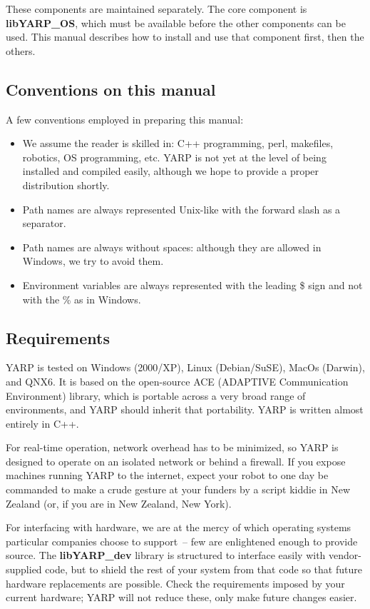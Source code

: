 These components are maintained separately.  The core component
is {\bf libYARP\_OS}, which must be available before the other 
components can be used.  This manual describes how to install and
use that component first, then the others.

\subsection{Conventions on this manual}
A few conventions employed in preparing this manual:

\begin{itemize}

\item We assume the reader is skilled in: C++ programming, perl, makefiles, robotics, OS programming, etc. YARP is not yet at the level of being installed and compiled easily, although we hope to provide a proper distribution shortly.

\item Path names are always represented Unix-like with the forward slash as a separator.

\item Path names are always without spaces: although they are allowed in Windows, we try to avoid them.

\item Environment variables are always represented with the leading \$ sign and not with the \% as in Windows.

\end{itemize}


\subsection{Requirements}

YARP is tested on Windows (2000/XP), Linux (Debian/SuSE), MacOs (Darwin), and QNX6.
It is based on the open-source ACE (ADAPTIVE Communication
Environment) library, which is portable across a very broad range of
environments, and YARP should inherit that portability. YARP is written almost 
entirely in C++.

For real-time operation, network overhead has to be minimized, so YARP
is designed to operate on an isolated network or behind a firewall.
If you expose machines running YARP to the internet, expect your robot
to one day be commanded to make a crude gesture at your funders by a
script kiddie in New Zealand (or, if you are in New Zealand, New
York).

For interfacing with hardware, we are at the mercy of which operating
systems particular companies choose to support~-- few are enlightened
enough to provide source.  The {\bf libYARP\_dev} library is structured
to interface easily with vendor-supplied code, but to shield the rest
of your system from that code so that future hardware replacements
are possible.  Check the requirements imposed by your current hardware;
YARP will not reduce these, only make future changes easier.

